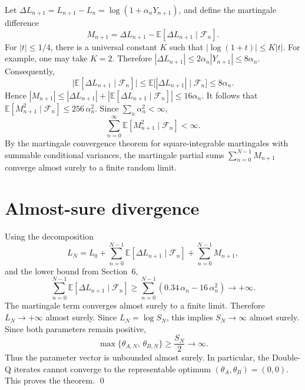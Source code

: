 \documentclass[11pt]{article}
\begin{document}
Let $\Delta L_{n+1} = L_{n+1} - L_n = \log(1 + \alpha_n Y_{n+1})$, and define the martingale difference
\begin{equation}
M_{n+1} = \Delta L_{n+1} - \mathbb{E}[\Delta L_{n+1} \mid \mathcal{F}_n].
\end{equation}
For $|t| \leq 1/4$, there is a universal constant $K$ such that $|\log(1+t)| \leq K|t|$. For example, one may take $K = 2$. Therefore $|\Delta L_{n+1}| \leq 2\alpha_n |Y_{n+1}| \leq 8\alpha_n$. Consequently,
\begin{equation}
\bigl|\mathbb{E}[\Delta L_{n+1} \mid \mathcal{F}_n]\bigr|
\leq \mathbb{E}\bigl[|\Delta L_{n+1}| \mid \mathcal{F}_n\bigr]
\leq 8\alpha_n.
\end{equation}
Hence $|M_{n+1}| \leq |\Delta L_{n+1}| + |\mathbb{E}[\Delta L_{n+1} \mid \mathcal{F}_n]| \leq 16\alpha_n$. It follows that $\mathbb{E}[M_{n+1}^2 \mid \mathcal{F}_n] \leq 256\,\alpha_n^2$. Since $\sum_n \alpha_n^2 < \infty$,
\begin{equation}
\sum_{n=0}^{\infty} \mathbb{E}[M_{n+1}^2 \mid \mathcal{F}_n] < \infty.
\end{equation}
By the martingale convergence theorem for square-integrable martingales with summable conditional variances, the martingale partial sums $\sum_{n=0}^{N-1} M_{n+1}$ converge almost surely to a finite random limit.

\section{Almost-sure divergence}

Using the decomposition
\begin{equation}\label{eq:doob}
L_N = L_0 + \sum_{n=0}^{N-1} \mathbb{E}[\Delta L_{n+1} \mid \mathcal{F}_n] + \sum_{n=0}^{N-1} M_{n+1},
\end{equation}
and the lower bound from Section~6,
\begin{equation}
\sum_{n=0}^{N-1} \mathbb{E}[\Delta L_{n+1} \mid \mathcal{F}_n]
\geq \sum_{n=0}^{N-1} (0.34\,\alpha_n - 16\,\alpha_n^2) \to +\infty.
\end{equation}
The martingale term converges almost surely to a finite limit. Therefore $L_N \to +\infty$ almost surely. Since $L_N = \log S_N$, this implies $S_N \to \infty$ almost surely. Since both parameters remain positive,
\begin{equation}
\max\{\theta_{A,N},\, \theta_{B,N}\} \geq \frac{S_N}{2} \to \infty.
\end{equation}
Thus the parameter vector is unbounded almost surely. In particular, the Double-Q iterates cannot converge to the representable optimum $(\theta_A, \theta_B) = (0,0)$. This proves the theorem. \qed
\end{document}
